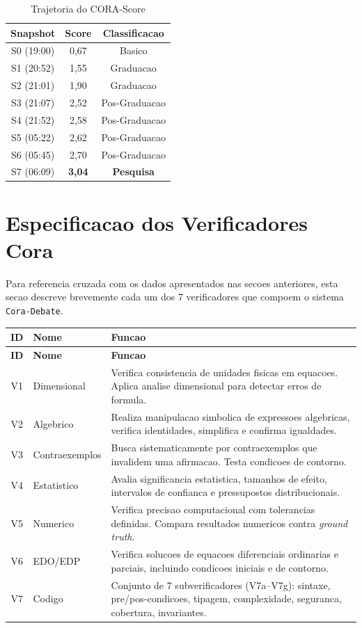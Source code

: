 \begin{table}[H]\centering\footnotesize
\caption{Trajetoria do CORA-Score}
\begin{tabular}{@{}c|c|c@{}}
\toprule
\textbf{Snapshot} & \textbf{Score} & \textbf{Classificacao} \\
\midrule
S0 (19:00) & 0,67 & Basico \\
S1 (20:52) & 1,55 & Graduacao \\
S2 (21:01) & 1,90 & Graduacao \\
S3 (21:07) & 2,52 & Pos-Graduacao \\
S4 (21:52) & 2,58 & Pos-Graduacao \\
S5 (05:22) & 2,62 & Pos-Graduacao \\
S6 (05:45) & 2,70 & Pos-Graduacao \\
S7 (06:09) & \textbf{3,04} & \textbf{Pesquisa} \\
\bottomrule
\end{tabular}
\end{table}

\newpage

\section{Especificacao dos Verificadores Cora}

Para referencia cruzada com os dados apresentados nas secoes anteriores, esta secao descreve brevemente cada um dos 7 verificadores que compoem o sistema \texttt{Cora-Debate}.

\begin{longtable}{|c|l|p{6.0cm}|}
\hline
\textbf{ID} & \textbf{Nome} & \textbf{Funcao} \\
\hline
\endfirsthead
\hline
\textbf{ID} & \textbf{Nome} & \textbf{Funcao} \\
\hline
\endhead
\hline
\endfoot
V1 & Dimensional & Verifica consistencia de unidades fisicas em equacoes. Aplica analise dimensional para detectar erros de formula. \\
\hline
V2 & Algebrico & Realiza manipulacao simbolica de expressoes algebricas, verifica identidades, simplifica e confirma igualdades. \\
\hline
V3 & Contraexemplos & Busca sistematicamente por contraexemplos que invalidem uma afirmacao. Testa condicoes de contorno. \\
\hline
V4 & Estatistico & Avalia significancia estatistica, tamanhos de efeito, intervalos de confianca e pressupostos distribucionais. \\
\hline
V5 & Numerico & Verifica precisao computacional com tolerancias definidas. Compara resultados numericos contra \textit{ground truth}. \\
\hline
V6 & EDO/EDP & Verifica solucoes de equacoes diferenciais ordinarias e parciais, incluindo condicoes iniciais e de contorno. \\
\hline
V7 & Codigo & Conjunto de 7 subverificadores (V7a--V7g): sintaxe, pre/pos-condicoes, tipagem, complexidade, seguranca, cobertura, invariantes. \\
\hline
\end{longtable}


